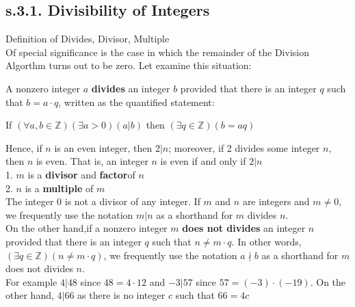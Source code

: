 \newpage
\subsection{s.3.1. Divisibility of Integers}

\begin{definition}
Definition of Divides, Divisor, Multiple \\

Of special significance is the case in which the remainder of the Division Algorthm turns out to be zero. Let examine this situation: 



\begin{tcolorbox}
A nonzero integer $a$ {\bf divides} an integer $b$ provided that there is an integer $q$ such that $b = a \cdot q$, written as the quantified statement: 
	\begin{center}
		If $(\forall a, b \in \mathbb{Z})(\exists a > 0)(a | b)$ then  $(\exists q \in \mathbb{Z})(b = aq)$
	\end{center}
\end{tcolorbox}

Hence, if $n$ is an even integer, then $2 | n$; moreover, if 2 divides some integer $n$, then $n$ is even. That is, an integer $n$ is even if and only if $2 | n$ \\
1. $m$ is a {\bf divisor} and {\bf factor}of $n$ \\
2. $n$ is a {\bf multiple} of $m$ \\
The integer $0$ is not a divisor of any integer. If $m$ and $n$ are integers and $m \neq 0$, we frequently use the notation $m | n$ as a shorthand for $m$ divides $n$. \\

On the other hand,if a nonzero integer $m$ {\bf does not divides} an integer $n$ provided that there is an integer $q$ such that $n \neq m \cdot q$. In other words, $(\exists q \in \mathbb{Z})(n \neq m \cdot q)$, we frequently use the notation $a \nmid b$ as a shorthand for $m$ does not divides $n$. \\

For example $4|48$ since $48 = 4 \cdot 12$ and $-3|57$ since $57 = (-3) \cdot (-19)$. On the other hand, $4|66$ as there is no integer $c$ such that $66 = 4c$ 

\end{definition} 


\newpage
